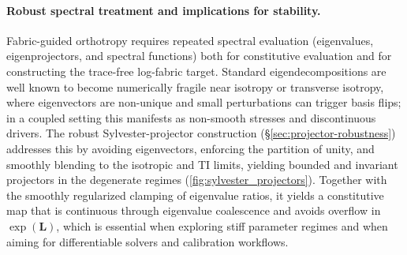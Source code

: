 \paragraph{Robust spectral treatment and implications for stability.}
Fabric-guided orthotropy requires repeated spectral evaluation (eigenvalues, eigenprojectors, and spectral functions) both for constitutive evaluation and for constructing the trace-free log-fabric target.
Standard eigendecompositions are well known to become numerically fragile near isotropy or transverse isotropy, where eigenvectors are non-unique and small perturbations can trigger basis flips; in a coupled setting this manifests as non-smooth stresses and discontinuous drivers.
The robust Sylvester-projector construction (\S\ref{sec:projector-robustness}) addresses this by avoiding eigenvectors, enforcing the partition of unity, and smoothly blending to the isotropic and TI limits, yielding bounded and invariant projectors in the degenerate regimes (\cref{fig:sylvester_projectors}).
Together with the smoothly regularized clamping of eigenvalue ratios, it yields a constitutive map that is continuous through eigenvalue coalescence and avoids overflow in $\exp(\mathbf{L})$, which is essential when exploring stiff parameter regimes and when aiming for differentiable solvers and calibration workflows.

